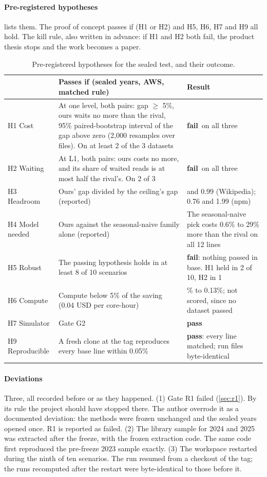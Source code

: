 \documentclass[11pt]{article}
\newcommand{\fail}{\textcolor{badc}{\textsf{\textbf{fail}}}}
\newcommand{\pass}{\textcolor{goodc}{\textsf{\textbf{pass}}}}
\begin{document}
\paragraph{Pre-registered hypotheses}  lists them. The proof of concept passes if (H1 or H2) and H5, H6, H7 and H9 all hold. The kill rule, also written in advance: if H1 and H2 both fail, the product thesis stops and the work becomes a paper.

\begin{table}[t]
\centering
\caption{Pre-registered hypotheses for the sealed test, and their outcome.}
\label{tab:hyp}
\small
\begin{tabularx}{\textwidth}{@{}l>{\raggedright\arraybackslash}X>{\raggedright\arraybackslash}p{4.6cm}@{}}
\toprule
& Passes if (sealed years, AWS, matched rule) & Result \\
\midrule
H1 Cost & At one level, both pairs: gap $\geq$ 5\%, ours waits no more than the rival, 95\% paired-bootstrap interval of the gap above zero (2,000 resamples over files). On at least 2 of the 3 datasets & \fail\ on all three \\
H2 Waiting & At L1, both pairs: ours costs no more, and its share of waited reads is at most half the rival's. On 2 of 3 & \fail\ on all three \\
H3 Headroom & Ours' gap divided by the ceiling's gap (reported) & 0.94 and 0.99 (Wikipedia); 0.76 and 1.99 (npm) \\
H4 Model needed & Ours against the seasonal-naive family alone (reported) & The seasonal-naive pick costs 0.6\% to 29\% more than the rival on all 12 lines \\
H5 Robust & The passing hypothesis holds in at least 8 of 10 scenarios & \fail: nothing passed in base. H1 held in 2 of 10, H2 in 1 \\
H6 Compute & Compute below 5\% of the saving (0.04 USD per core-hour) & 0.01\% to 0.13\%; not scored, since no dataset passed \\
H7 Simulator & Gate G2 & \pass \\
H9 Reproducible & A fresh clone at the tag reproduces every base line within 0.05\% & \pass: every line matched; run files byte-identical \\
\bottomrule
\end{tabularx}
\end{table}

\paragraph{Deviations} Three, all recorded before or as they happened. (1) Gate R1 failed (\cref{sec:r1}). By its rule the project should have stopped there. The author overrode it as a documented deviation: the methods were frozen unchanged and the sealed years opened once. R1 is reported as failed. (2) The library sample for 2024 and 2025 was extracted after the freeze, with the frozen extraction code. The same code first reproduced the pre-freeze 2023 sample exactly. (3) The workspace restarted during the ninth of ten scenarios. The run resumed from a checkout of the tag; the runs recomputed after the restart were byte-identical to those before it.
\end{document}
